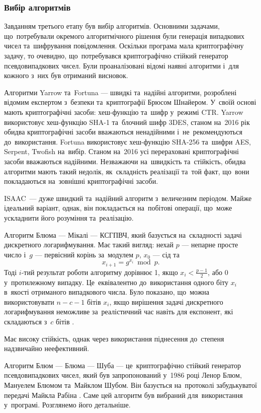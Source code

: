 \documentclass[a4paper,oneside,titlepage,14pt]{extarticle}
\begin{document}
			\subsubsection{Вибір алгоритмів}
				Завданням третього етапу був вибір алгоритмів. Основними задачами, що~потребували окремого алгоритмічного рішення були генерація випадкових чисел та~шифрування повідомлення.
				Оскільки програма мала криптографічну задачу, то очевидно, що~потребувався криптографічно стійкий генератор псевдовипадкових чисел. Були проаналізовані відомі наявні алгоритми і~для кожного з~них був отриманий висновок.\par
				Алгоритми Yarrow та~Fortuna --- швидкі та~надійні алгоритми, розроблені відомим експертом з~безпеки та~криптографії Брюсом Шнайером. У~своїй основі мають криптографічні засоби: хеш-функцію та~шифр у~режимі CTR. Yarrow використовує хеш-функцію SHA-1 та~блочний шифр 3DES, станом на~2016 рік обидва криптографічні засоби вважаються ненадійними і~не~рекомендуються до~використання. Fortuna використовує хеш-функцію SHA-256 та~шифри AES, Serpent, Twofish на~вибір. Станом на~2016 усі перераховані криптографічні засоби вважаються надійними. Незважаючи на~швидкість та~стійкість, обидва алгоритми мають такий недолік, як~складність реалізації та~той факт, що~вони покладаються на~зовнішні криптографічні засоби.\par
				ISAAC~--- дуже швидкий та~надійний алгоритм з~величезним періодом. Майже ідеальний варіант, однак, він покладається на~побітові операції, що~може ускладнити його розуміння та~реалізацію.\par
				Алгоритм Блюма --- Мікалі --- КСГПВЧ, який базується на~складності задачі дискретного логарифмування. Має такий вигляд: нехай $p$ --- непарне просте число і~$g$ --- первісний корінь за~модулем $p$, $x_0$ --- сід та~
				\[
					x_{i+1} = g^{x_i} \bmod{p}.
				\]
				Тоді $i$-тий результат роботи алгоритму дорівнює 1, якщо $x_i < \frac{p-1}{2}$, або 0 у~протилежному випадку. Це~еквівалентно до~використання одного біту $x_i$ в~якості отриманого випадкового числа. Було показано, що~можна використовувати $n-c-1$ бітів $x_i$, якщо вирішення задачі дискретного логарифмування неможливе за~реалістичний час навіть для експонент, які складаються з~$c$ бітів \cite{Gennaro2005}.\par
				Має високу стійкість, однак через використання піднесення до~степеня надзвичайно неефективний.\par
				Алгоритм Блюм --- Блюма --- Шуба --- це~криптографічно стійкий генератор псевдовипадкових чисел, який був запропонований у~1986 році Ленор Блюм, Мануелем Блюмом та~Майклом Шубом. Він базується на~протоколі забудькуватої передачі Майкла Рабіна \cite{asimpleunpredictableprng}. Саме цей алгоритм був вибраний для~використання у~програмі. Розглянемо його детальніше.\par
\end{document}
